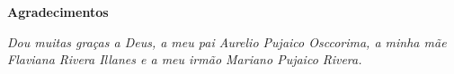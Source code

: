 \cleardoublepage

\begin{center}
\Huge{\textbf{Agradecimentos}}
\end{center}

\null
\vfill
\thispagestyle{empty}

{\normalsize \it \hfill Dou muitas graças a Deus,
a meu pai Aurelio Pujaico Osccorima, a minha mãe Flaviana Rivera Illanes
e a meu irmão Mariano Pujaico Rivera.  \vspace*{4pt}}




\begin{comment}
{\normalsize \it Dou muitas graças por me 
ajudar a corrigir alguns dos erros na escrita do livro a:
Andre Lima.
\vspace*{4pt}}
\end{comment}


\begin{comment}
{\normalsize \it Dou muitas graças a \textcolor{red}{XXXXX XXXXXXXXX} por me 
ajudar a revisar a forma da escrita na linguagem matemática do livro.
\vspace*{4pt}}
\end{comment}

\begin{comment}
{\normalsize \it Dou muitas graças a XXXXX XXXXXXXXX por me 
ajudar a resolver muitas duvidas sobre definições e uso de termos na XXXXXXX XXXXXXX.
\vspace*{4pt}}
\end{comment}

\begin{comment}
{\normalsize \it Dou muitas graças a XXXXX XXXXXXXXX pela 
suas sugestões e revisão  do capitulo XXXXX XXXXXXXXX.
\vspace*{4pt}}
\end{comment}


